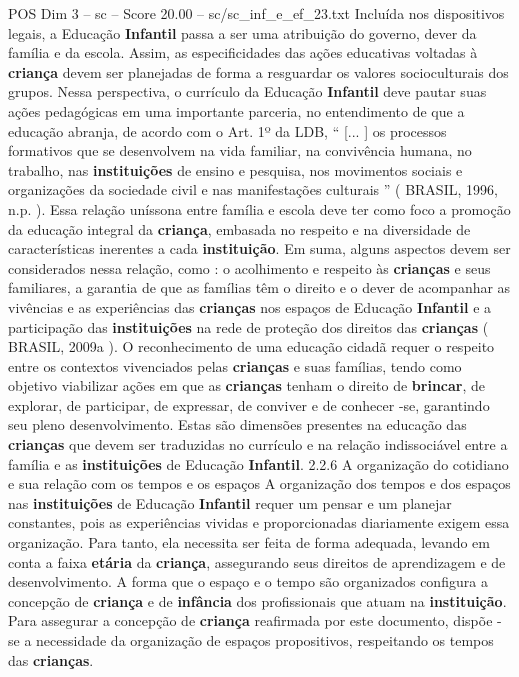 \begin{textsample}{POS Dim 3 – sc – Score 20.00 – sc/sc\_inf\_e\_ef\_23.txt}
Incluída nos dispositivos legais, a Educação \textbf{Infantil} passa a ser uma atribuição do governo, dever da família e da escola.
Assim, as especificidades das ações educativas voltadas à \textbf{criança} devem ser planejadas de forma a resguardar os valores socioculturais dos grupos.
Nessa perspectiva, o currículo da Educação \textbf{Infantil} deve pautar suas ações pedagógicas em uma importante parceria, no entendimento de que a educação abranja, de acordo com o Art. 1º da LDB, “ [... ] os processos formativos que se desenvolvem na vida familiar, na convivência humana, no trabalho, nas \textbf{instituições} de ensino e pesquisa, nos movimentos sociais e organizações da sociedade civil e nas manifestações culturais ” ( BRASIL, 1996, n.p. ).
Essa relação uníssona entre família e escola deve ter como foco a promoção da educação integral da \textbf{criança}, embasada no respeito e na diversidade de características inerentes a cada \textbf{instituição}.
Em suma, alguns aspectos devem ser considerados nessa relação, como : o acolhimento e respeito às \textbf{crianças} e seus familiares, a garantia de que as famílias têm o direito e o dever de acompanhar as vivências e as experiências das \textbf{crianças} nos espaços de Educação \textbf{Infantil} e a participação das \textbf{instituições} na rede de proteção dos direitos das \textbf{crianças} ( BRASIL, 2009a ).
O reconhecimento de uma educação cidadã requer o respeito entre os contextos vivenciados pelas \textbf{crianças} e suas famílias, tendo como objetivo viabilizar ações em que as \textbf{crianças} tenham o direito de \textbf{brincar}, de explorar, de participar, de expressar, de conviver e de conhecer -se, garantindo seu pleno desenvolvimento.
Estas são dimensões presentes na educação das \textbf{crianças} que devem ser traduzidas no currículo e na relação indissociável entre a família e as \textbf{instituições} de Educação \textbf{Infantil}. 2.2.6 A organização do cotidiano e sua relação com os tempos e os espaços A organização dos tempos e dos espaços nas \textbf{instituições} de Educação \textbf{Infantil} requer um pensar e um planejar constantes, pois as experiências vividas e proporcionadas diariamente exigem essa organização.
Para tanto, ela necessita ser feita de forma adequada, levando em conta a faixa \textbf{etária} da \textbf{criança}, assegurando seus direitos de aprendizagem e de desenvolvimento.
A forma que o espaço e o tempo são organizados configura a concepção de \textbf{criança} e de \textbf{infância} dos profissionais que atuam na \textbf{instituição}.
Para assegurar a concepção de \textbf{criança} reafirmada por este documento, dispõe -se a necessidade da organização de espaços propositivos, respeitando os tempos das \textbf{crianças}.

\end{textsample}
